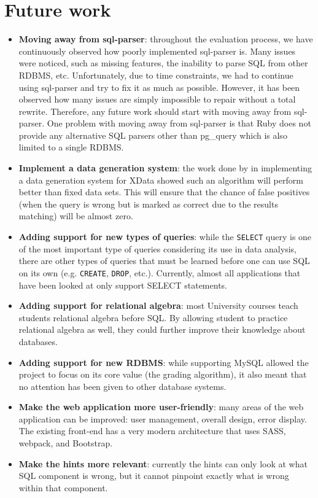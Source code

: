 \section{Future work}
\begin{itemize}
    \item \textbf{Moving away from sql-parser}: throughout the evaluation process, we have continuously observed how poorly implemented sql-parser is. Many issues were noticed, such as missing features, the inability to parse SQL from other RDBMS, etc. Unfortunately, due to time constraints, we had to continue using sql-parser and try to fix it as much as possible. However, it has been observed how many issues are simply impossible to repair without a total rewrite. Therefore, any future work should start with moving away from sql-parser. One problem with moving away from sql-parser is that Ruby does not provide any alternative SQL parsers other than pg\_query which is also limited to a single RDBMS.
    \item \textbf{Implement a data generation system}: the work done by \citet{lit:xdata_d} in implementing a data generation system for XData showed such an algorithm will perform better than fixed data sets. This will ensure that the chance of false positives (when the query is wrong but is marked as correct due to the results matching) will be almost zero.
    \item \textbf{Adding support for new types of queries}: while the \texttt{SELECT} query is one of the most important type of queries considering its use in data analysis, there are other types of queries that must be learned before one can use SQL on its own (e.g. \texttt{CREATE}, \texttt{DROP}, etc.). Currently, almost all applications that have been looked at only support SELECT statements.
    \item \textbf{Adding support for relational algebra}: most University courses teach students relational algebra before SQL. By allowing student to practice relational algebra as well, they could further improve their knowledge about databases.
    \item \textbf{Adding support for new RDBMS}: while supporting MySQL allowed the project to focus on its core value (the grading algorithm), it also meant that no attention has been given to other database systems.
    \item \textbf{Make the web application more user-friendly}: many areas of the web application can be improved: user management, overall design, error display. The existing front-end has a very modern architecture that uses SASS, webpack, and Bootstrap.
    \item \textbf{Make the hints more relevant}: currently the hints can only look at what SQL component is wrong, but it cannot pinpoint exactly what is wrong within that component.
\end{itemize}